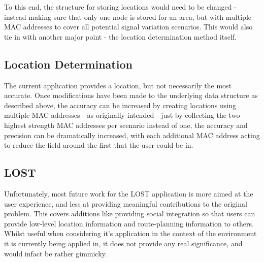 \documentclass[11pt]{informatics-report}
\begin{document}
To this end, the structure for storing locations would need to be changed - instead making sure that only one node is stored for an area, but with multiple MAC addresses to cover all potential signal variation scenarios. This would also tie in with another major point - the location determination method itself.

\subsection{Location Determination}

The current application provides a location, but not necessarily the most accurate. Once modifications have been made to the underlying data structure as described above, the accuracy can be increased by creating locations using multiple MAC addresses - as originally intended - just by collecting the two highest strength MAC addresses per scenario instead of one, the accuracy and precision can be dramatically increased, with each additional MAC address acting to reduce the field around the first that the user could be in.

\subsection{LOST}

Unfortunately, most future work for the LOST application is more aimed at the user experience, and less at providing meaningful contributions to the original problem. This covers additions like providing social integration so that users can provide low-level location information and route-planning information to others. Whilst useful when considering it's application in the context of the environment it is currently being applied in, it does not provide any real significance, and would infact be rather gimmicky.


%
%
%
%
%
%



\appendix

%
%
\end{document}
